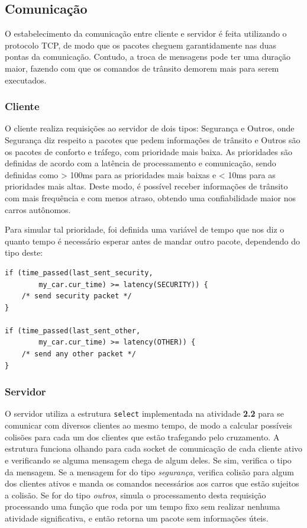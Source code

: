\documentclass[10pt,twocolumn,letterpaper]{article}
\begin{document}
\subsection{Comunicação}
    O estabelecimento da comunicação entre cliente e servidor é feita utilizando o protocolo TCP, de modo que os pacotes cheguem garantidamente nas duas pontas da comunicação. Contudo, a troca de mensagens pode ter uma duração maior, fazendo com que os comandos de trânsito demorem mais para serem executados.

    \subsubsection{Cliente}
        O cliente realiza requisições ao servidor de dois tipos: Segurança e Outros, onde Segurança diz respeito a pacotes que pedem informações de trânsito e Outros são os pacotes de conforto e tráfego, com prioridade mais baixa. As prioridades são definidas de acordo com a latência de processamento e comunicação, sendo definidas como > 100ms para as prioridades mais baixas e < 10ms para as prioridades mais altas. Deste modo, é possível receber informações de trânsito com mais frequência e com menos atraso, obtendo uma confiabilidade maior nos carros autônomos.
        
        Para simular tal prioridade, foi definida uma variável de tempo que nos diz o quanto tempo é necessário esperar antes de mandar outro pacote, dependendo do tipo deste:

\begin{lstlisting}[caption={Demonstração do código para o envio de pacotes}, label=Algorithm]
if (time_passed(last_sent_security, 
        my_car.cur_time) >= latency(SECURITY)) {
    /* send security packet */
}

if (time_passed(last_sent_other, 
        my_car.cur_time) >= latency(OTHER)) {
    /* send any other packet */
}
\end{lstlisting}

    \subsubsection{Servidor}
        O servidor utiliza a estrutura \texttt{select} implementada na atividade \textbf{2.2} para se comunicar com diversos clientes ao mesmo tempo, de modo a calcular possíveis colisões para cada um dos clientes que estão trafegando pelo cruzamento. A estrutura funciona olhando para cada socket de comunicação de cada cliente ativo e verificando se alguma mensagem chega de algum deles. Se sim, verifica o tipo da mensagem. Se a mensagem for do tipo \textit{segurança}, verifica colisão para algum dos clientes ativos e manda os comandos necessários aos carros que estão sujeitos a colisão. Se for do tipo \textit{outros}, simula o processamento desta requisição processando uma função que roda por um tempo fixo sem realizar nenhuma atividade significativa, e então retorna um pacote sem informações úteis.
            
\end{document}
